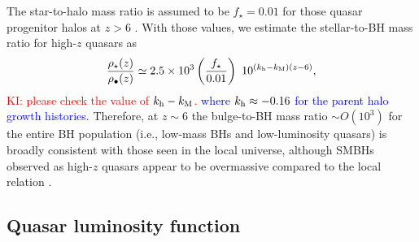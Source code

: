 \documentclass[twocolumn, twocolappendix]{aastex63}
\newcommand{\Msunyr}{M_\odot~{\rm yr}^{-1}}
\newcommand{\Mh}{M_\mathrm{h}}
\newcommand{\D}{\mathrm{d}}
\newcommand{\red}[1]{\textcolor{red}{ #1}}
\newcommand{\blue}[1]{\textcolor{blue}{ #1}}
\begin{document}
\begin{CJK*}{UTF8}{gbsn}

The star-to-halo mass ratio is assumed to be $f_\star =0.01$ for those quasar progenitor halos at $z>6$
\citep[fits by code {\tt UNIVERSEMACHINE} in][]{2019MNRAS.488.3143B}.
With those values, we estimate the stellar-to-BH mass ratio for high-$z$ quasars as
%
\begin{equation}
\frac{\rho_{\star}(z)}{\rho_{\bullet}(z)}
\simeq 2.5\times 10^{3} \left(\frac{f_\star}{0.01}\right)
~ 10^{(k_{\rm h}-k_{\rm M})(z-6)},
\end{equation}
% 
\red{KI: please check the value of $k_{\rm h}-k_{\rm M}$.}
\blue{
where $k_{\rm h} \approx -0.16 $ for the parent halo growth histories.
}
Therefore, at $z\sim 6$ the bulge-to-BH mass ratio $\sim O(10^3)$ for the entire BH population (i.e., low-mass BHs and low-luminosity quasars) 
is broadly consistent with those seen in the local universe, although SMBHs observed as high-$z$ quasars
appear to be overmassive compared to the local relation \citep[e.g.,][]{2013ApJ...773...44W,2020A&A...637A..84P}.



\subsection{Quasar luminosity function}


\end{CJK*}
\end{document}
